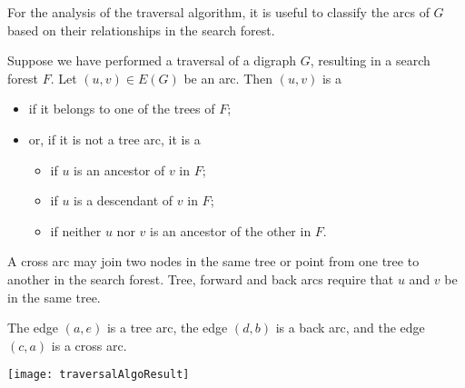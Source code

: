 For the analysis of the traversal algorithm, it is useful to classify the arcs of $G$ based on their relationships in the search forest.  

\begin{Definition}\label{defn:arc-types}
Suppose we have performed a traversal of a digraph $G$, resulting in a
search forest $F$.  Let $(u, v)\in E(G)$ be an arc. Then $(u, v)$ is a
\begin{itemize} 
\item {} if it belongs to one of the trees of $F$;
\item or, if it is not a tree arc, it is a
\begin{itemize}
\item {} if $u$ is an ancestor of $v$ in $F$;
\item {} if $u$ is a descendant of $v$ in $F$; 
\item {} if neither $u$ nor $v$ is an ancestor of the other in $F$.
\end{itemize}
\end{itemize}
\end{Definition} 

A cross arc may join two nodes in the same tree or point from one tree to another in the search forest. Tree, forward and back arcs require that $u$ and $v$ be in the same tree.

\begin{Boxample}
The edge $(a, e)$ is a tree arc, the edge $(d, b)$ is a back arc, and the edge $(c, a)$ is a cross arc.
\begin{center}
\texttt{[image: traversalAlgoResult]} 
\end{center}
\end{Boxample}




